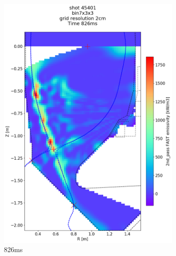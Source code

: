 \begin{figure}
\begin{subfigure}{0.395\linewidth}
         \includegraphics[trim={75 95 0 195},clip,width=\textwidth]{Chapters/chapter2/figs/IRVB-MASTU_shot-45401_export_87.png}
         \vspace*{-6.5mm}
         \caption{826ms}
         \label{fig:45401_export2_4}
     \end{subfigure}
     \begin{subfigure}{0.395\linewidth}
         \centering

\end{subfigure}
\end{figure}
